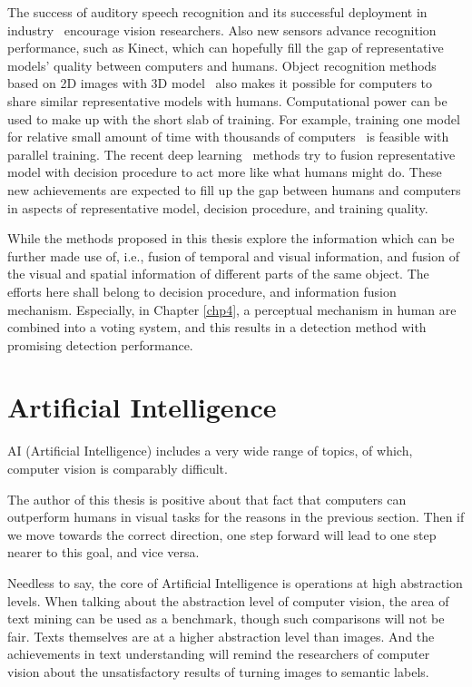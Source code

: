 The success of auditory speech recognition and its successful deployment in industry~\citep{siri} encourage vision researchers. Also new sensors advance recognition performance, such as Kinect, which can hopefully fill the gap of representative models' quality between computers and humans. Object recognition methods based on 2D images with 3D model~\citep{r3d} also makes it possible for computers to share similar representative models with humans.  Computational power can be used to make up with the short slab of training. For example, training one model for relative small amount of time with thousands of computers~\citep{dnnnn} is feasible with parallel training. The recent deep learning~\citep{dlearn} methods try to fusion representative model with decision procedure to act more like what humans might do. These new achievements are expected to fill up the gap between humans and computers in aspects of representative model, decision procedure, and training quality.



While the methods proposed in this thesis explore the information which can be further made use of, i.e., fusion of temporal and visual information, and fusion of the visual and spatial information of different parts of the same object. The efforts here shall belong to decision procedure, and information fusion mechanism. Especially, in Chapter \ref{chp4}, a perceptual mechanism in human are combined into a voting system, and this results in a detection method with promising detection performance.

\section{Artificial Intelligence}
\label{ch2ai}
AI (Artificial Intelligence) includes a very wide range of topics, of which, computer vision is comparably difficult.

The author of this thesis is positive about that fact that computers can outperform humans in visual tasks for the reasons in the previous section. Then if we move towards the correct direction, one step forward will lead to one step nearer to this goal, and vice versa.

Needless to say, the core of Artificial Intelligence is operations at high abstraction levels. When talking about the abstraction level of computer vision, the area of text mining can be used as a benchmark, though such comparisons will not be fair. Texts themselves are at a higher abstraction level than images. And the achievements in text understanding will remind the researchers of computer vision about the unsatisfactory results of turning images to semantic labels.

